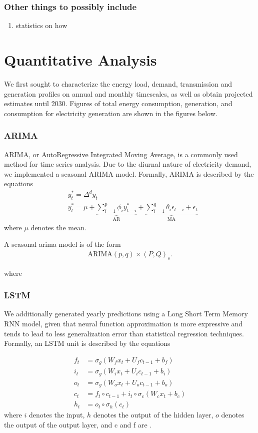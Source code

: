 \documentclass[plain]{article}
\newcommand{\1}{\mathbbm{1}}
\begin{document}
\subsubsection{Other things to possibly include}
\begin{enumerate}
	\item statistics on how 
\end{enumerate}
\section{Quantitative Analysis}
We first sought to characterize the energy load, demand, transmission and generation profiles on annual and monthly timescales, as well as obtain projected estimates until 2030. Figures of total energy consumption, generation, and consumption for electricity generation are shown in the figures below.

\subsubsection{ARIMA}
ARIMA, or AutoRegressive Integrated Moving Average, is a commonly used method for time series analysis. Due to the diurnal nature of electricity demand, we implemented a seasonal ARIMA model. Formally, ARIMA is described by the equations
\begin{align}
&y_{t}^{*}=\Delta^{d} y_{t} \\
&y_{t}^{*}=\mu+\underbrace{\sum_{i=1}^{p} \phi_{i} y_{t-i}^{*}}_{\mathrm{AR}}+\underbrace{\sum_{i=1}^{q} \theta_{i} \epsilon_{t-i}+\epsilon_{t}}_{\mathrm{MA}}
\end{align}
where $\mu$ denotes the mean.

A seasonal arima model is of the form 
\begin{align}
	\text{ARIMA}(p,q) \times (P,Q)_s
.\end{align}


where 

\subsubsection{LSTM}
We additionally generated yearly predictions using a Long Short Term Memory RNN model, given that neural function approximation is more expressive and tends to lead to less generalization error than statistical regression techniques. Formally, an LSTM unit is described by the equations

\begin{align}
f_{t} &=\sigma_{g}\left(W_{f} x_{t}+U_{f} c_{t-1}+b_{f}\right) \\
i_{t} &=\sigma_{g}\left(W_{i} x_{t}+U_{i} c_{t-1}+b_{i}\right) \\
o_{t} &=\sigma_{g}\left(W_{o} x_{t}+U_{o} c_{t-1}+b_{o}\right) \\
c_{t} &=f_{t} \circ c_{t-1}+i_{t} \circ \sigma_{c}\left(W_{c} x_{t}+b_{c}\right) \\
h_{t} &=o_{t} \circ \sigma_{h}\left(c_{t}\right)
\end{align}
where $i$ denotes the input, $h$ denotes the output of the hidden layer, $o$ denotes the output of the output layer, and c and f are .
\end{document}
